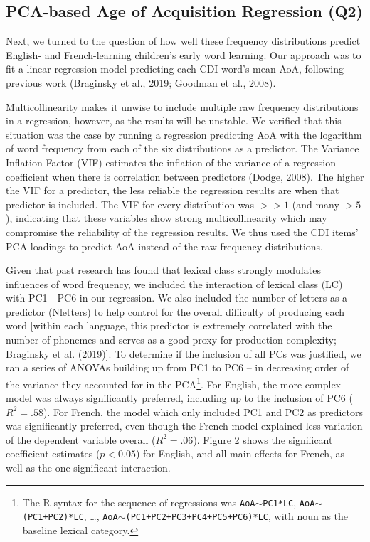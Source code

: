\documentclass[10pt, letterpaper]{article}
\begin{document}
\hypertarget{pca-based-age-of-acquisition-regression-q2}{%
\subsection{PCA-based Age of Acquisition Regression
(Q2)}\label{pca-based-age-of-acquisition-regression-q2}}

Next, we turned to the question of how well these frequency
distributions predict English- and French-learning children's early word
learning. Our approach was to fit a linear regression model predicting
each CDI word's mean AoA, following previous work (Braginsky et al.,
2019; Goodman et al., 2008).

Multicollinearity makes it unwise to include multiple raw frequency
distributions in a regression, however, as the results will be unstable.
We verified that this situation was the case by running a regression
predicting AoA with the logarithm of word frequency from each of the six
distributions as a predictor. The Variance Inflation Factor (VIF)
estimates the inflation of the variance of a regression coefficient when
there is correlation between predictors (Dodge, 2008). The higher the
VIF for a predictor, the less reliable the regression results are when
that predictor is included. The VIF for every distribution was \(>>1\)
(and many \(>5\)), indicating that these variables show strong
multicollinearity which may compromise the reliability of the regression
results. We thus used the CDI items' PCA loadings to predict AoA instead
of the raw frequency distributions.

Given that past research has found that lexical class strongly modulates
influences of word frequency, we included the interaction of lexical
class (LC) with PC1 - PC6 in our regression. We also included the number
of letters as a predictor (Nletters) to help control for the overall
difficulty of producing each word {[}within each language, this
predictor is extremely correlated with the number of phonemes and serves
as a good proxy for production complexity; Braginsky et al. (2019){]}.
To determine if the inclusion of all PCs was justified, we ran a series
of ANOVAs building up from PC1 to PC6 -- in decreasing order of the
variance they accounted for in the PCA\footnote{The R syntax for the
  sequence of regressions was \texttt{AoA}\(\sim\)\texttt{PC1*LC},
  \texttt{AoA}\(\sim\)\texttt{(PC1+PC2)*LC}, \ldots,
  \texttt{AoA}\(\sim\)\texttt{(PC1+PC2+PC3+PC4+PC5+PC6)*LC}, with noun
  as the baseline lexical category.}. For English, the more complex
model was always significantly preferred, including up to the inclusion
of PC6 (\(R^2 = .58\)). For French, the model which only included PC1
and PC2 as predictors was significantly preferred, even though the
French model explained less variation of the dependent variable overall
(\(R^2 = .06\)). Figure 2 shows the significant coefficient estimates
(\(p<0.05\)) for English, and all main effects for French, as well as
the one significant interaction.
\end{document}
